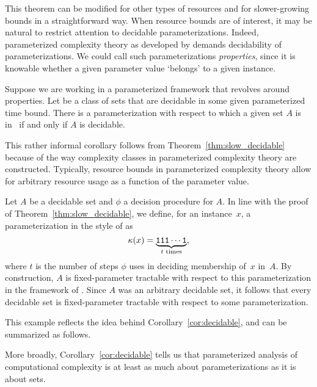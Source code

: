 This theorem can be modified for other types of resources and for slower-growing bounds in a straightforward way.
When resource bounds are of interest, it may be natural to restrict attention to decidable parameterizations.
Indeed, parameterized complexity theory as developed by \textcite{flum2006parameterized} demands decidability of parameterizations.
We could call such parameterizations \emph{properties}, since it is knowable whether a given parameter value `belongs' to a given instance.
\begin{corollary}
\label{cor:decidable}%
  Suppose we are working in a parameterized framework that revolves around properties.
  Let  be a class of sets that are decidable in some given parameterized time bound.
  There is a parameterization with respect to which a given set $A$ is in~ if and only if $A$ is decidable.
\end{corollary}

This rather informal corollary follows from Theorem~\ref{thm:slow_decidable} because of the way complexity classes in parameterized complexity theory are constructed.
Typically, resource bounds in parameterized complexity theory allow for arbitrary resource usage as a function of the parameter value.

\begin{example}
  Let $A$ be a decidable set and $\phi$ a decision procedure for $A$.
  In line with the proof of Theorem~\ref{thm:slow_decidable}, we define, for an instance~$x$, a parameterization in the style of \citeauthor{flum2006parameterized} as
  \begin{equation*}
    \kappa(x) = \underbrace{\textnormal{\texttt{111}}\cdots\textnormal{\texttt{1}}}_{\text{$t$ times}},
  \end{equation*}
  where $t$ is the number of steps $\phi$ uses in deciding membership of~$x$ in~$A$.
  By construction, $A$ is fixed-parameter tractable with respect to this parameterization in the framework of \citeauthor{flum2006parameterized}.
  Since $A$ was an arbitrary decidable set, it follows that every decidable set is fixed-parameter tractable with respect to some parameterization.
\end{example}

This example reflects the idea behind Corollary~\ref{cor:decidable}, and can be summarized as follows.

More broadly, Corollary~\ref{cor:decidable} tells us that parameterized analysis of computational complexity is at least as much about parameterizations as it is about sets.

